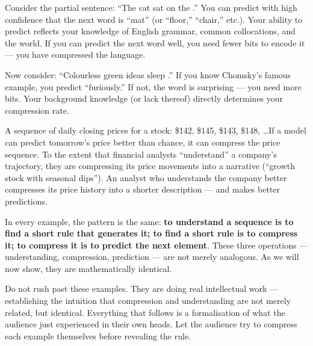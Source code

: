 \documentclass[11pt, a4paper]{article}
\begin{document}
\begin{example}[title={Example 3: Language Itself}]
Consider the partial sentence: ``The cat sat on the \underline{\hspace{1.5cm}}.'' You can predict with high confidence that the next word is ``mat'' (or ``floor,'' ``chair,'' etc.). Your ability to predict reflects your knowledge of English grammar, common collocations, and the world. If you can predict the next word well, you need fewer bits to encode it --- you have compressed the language.

Now consider: ``Colourless green ideas sleep \underline{\hspace{1.5cm}}.'' If you know Chomsky's famous example, you predict ``furiously.'' If not, the word is surprising --- you need more bits. Your background knowledge (or lack thereof) directly determines your compression rate.
\end{example}

\begin{example}[title={Example 4: Stock Prices}]
A sequence of daily closing prices for a stock: \$142, \$145, \$143, \$148, \ldots If a model can predict tomorrow's price better than chance, it can compress the price sequence. To the extent that financial analysts ``understand'' a company's trajectory, they are compressing its price movements into a narrative (``growth stock with seasonal dips''). An analyst who understands the company better compresses its price history into a shorter description --- and makes better predictions.
\end{example}

\begin{keyinsight}
In every example, the pattern is the same: \textbf{to understand a
sequence is to find a short rule that generates it; to find a short rule
is to compress it; to compress it is to predict the next element}. These
three operations --- understanding, compression, prediction --- are not
merely analogous. As we will now show, they are mathematically identical.
\end{keyinsight}

\begin{speakingnote}
Do not rush past these examples. They are doing real intellectual work ---
establishing the intuition that compression and understanding are not
merely related, but identical. Everything that follows is a formalisation
of what the audience just experienced in their own heads. Let the audience
try to compress each example themselves before revealing the rule.
\end{speakingnote}
\end{document}
